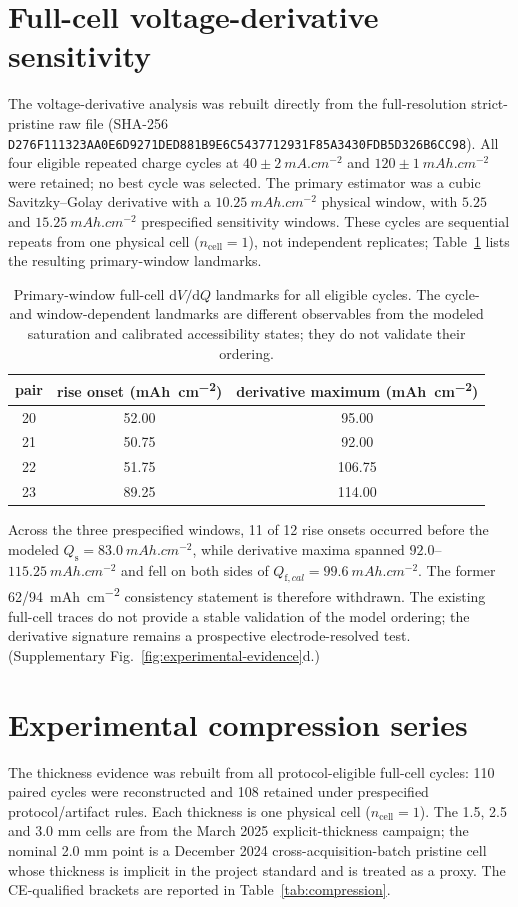\documentclass[11pt]{article}
\begin{document}
\section{Full-cell voltage-derivative sensitivity}\label{sec:g4audit}
The voltage-derivative analysis was rebuilt directly from the full-resolution strict-pristine raw file
(SHA-256 \texttt{D276F111323AA0E6\allowbreak D9271DED881B9E6C\allowbreak 5437712931F85A34\allowbreak 30FDB5D326B6CC98}). All four
eligible repeated charge cycles at $40\pm2~\si{mA.cm^{-2}}$ and $120\pm1~\si{mAh.cm^{-2}}$ were retained;
no best cycle was selected. The primary estimator was a cubic Savitzky--Golay derivative with a
$10.25~\si{mAh.cm^{-2}}$ physical window, with $5.25$ and $15.25~\si{mAh.cm^{-2}}$ prespecified
sensitivity windows. These cycles are sequential repeats from one physical cell ($n_{\mathrm{cell}}=1$),
not independent replicates; Table~\ref{tab:g4audit} lists the resulting primary-window landmarks.

\begin{table}[tbp]\centering\small
\caption{Primary-window full-cell $\mathrm{d}V/\mathrm{d}Q$ landmarks for all eligible cycles. The
cycle- and window-dependent landmarks are different observables from the modeled saturation and calibrated
accessibility states; they do not validate their ordering.}
\label{tab:g4audit}
\begin{tabular}{ccc}
\toprule
pair & rise onset (\si{mAh.cm^{-2}}) & derivative maximum (\si{mAh.cm^{-2}})\\
\midrule
20 & 52.00 & 95.00\\
21 & 50.75 & 92.00\\
22 & 51.75 & 106.75\\
23 & 89.25 & 114.00\\
\bottomrule
\end{tabular}
\end{table}

Across the three prespecified windows, 11 of 12 rise onsets occurred before the modeled
$Q_{\mathrm s}=\SI{83.0}{mAh.cm^{-2}}$, while derivative maxima spanned
$92.0$--$115.25~\si{mAh.cm^{-2}}$ and fell on both sides of
$Q_{\mathrm f,cal}=\SI{99.6}{mAh.cm^{-2}}$. The former 62/94~\si{mAh.cm^{-2}} consistency statement is
therefore withdrawn. The existing full-cell traces do not provide a stable validation of the model ordering;
the derivative signature remains a prospective electrode-resolved test.
(Supplementary Fig.~\ref{fig:experimental-evidence}d.)

\section{Experimental compression series}\label{sec:compression}
The thickness evidence was rebuilt from all protocol-eligible full-cell cycles: 110 paired cycles were
reconstructed and 108 retained under prespecified protocol/artifact rules. Each thickness is one physical
cell ($n_{\mathrm{cell}}=1$). The 1.5, 2.5 and 3.0 mm cells are from the March 2025 explicit-thickness
campaign; the nominal 2.0 mm point is a December 2024 cross-acquisition-batch pristine cell whose thickness is
implicit in the project standard and is treated as a proxy. The CE-qualified brackets are reported in
Table~\ref{tab:compression}.
\end{document}
